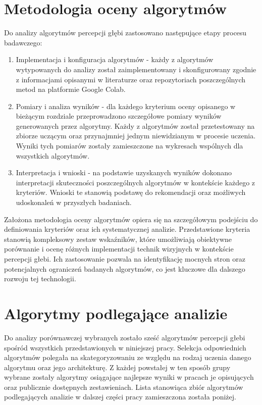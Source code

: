 \section{Metodologia oceny algorytmów}
Do analizy algorytmów percepcji głębi zastosowano następujące etapy procesu badawczego:
\begin{enumerate}
    \item Implementacja i konfiguracja algorytmów - każdy z algorytmów wytypowanych do analizy został zaimplementowany i skonfigurowany zgodnie z informacjami opisanymi w literaturze oraz repozytoriach poszczególnych metod na platformie Google Colab.
    \item Pomiary i analiza wyników - dla każdego kryterium oceny opisanego w bieżącym rozdziale przeprowadzono szczegółowe pomiary wyników generowanych przez algorytmy. Każdy z algorytmów został przetestowany na zbiorze uczącym oraz przynajmniej jednym niewidzianym w procesie uczenia. Wyniki tych pomiarów zostały zamieszczone na wykresach wspólnych dla wszystkich algorytmów.
    \item Interpretacja i wnioski - na podstawie uzyskanych wyników dokonano interpretacji skuteczności poszczególnych algorytmów w kontekście każdego z kryteriów. Wnioski te stanowią podstawę do rekomendacji oraz możliwych udoskonaleń w przyszłych badaniach.
\end{enumerate}

Założona metodologia oceny algorytmów opiera się na szczegółowym podejściu do definiowania kryteriów oraz ich systematycznej analizie. Przedstawione kryteria stanowią kompleksowy zestaw wskaźników, które umożliwiają obiektywne porównanie i ocenę różnych implementacji technik wizyjnych w kontekście percepcji głebi. Ich zastosowanie pozwala na identyfikację mocnych stron oraz potencjalnych ograniczeń badanych algorytmów, co jest kluczowe dla dalszego rozwoju tej technologii.

\section{Algorytmy podlegające analizie}
Do analizy porównawczej wybranych zostało sześć algorytmów percepcji głebi spośród wszystkich przedstawionych w niniejszej pracy. Selekcja odpowiednich algorytmów polegała na skategoryzowaniu ze względu na rodzaj uczenia danego algorytmu oraz jego architekturę. Z każdej powstałej w ten sposób grupy wybrane zostały algorytmy osiągające najlepsze wyniki w pracach je opisujących oraz publicznie dostępnych zestawieniach. Lista stanowiąca zbiór algorytmów podlegających analizie w dalszej części pracy zamieszczona została poniżej.


